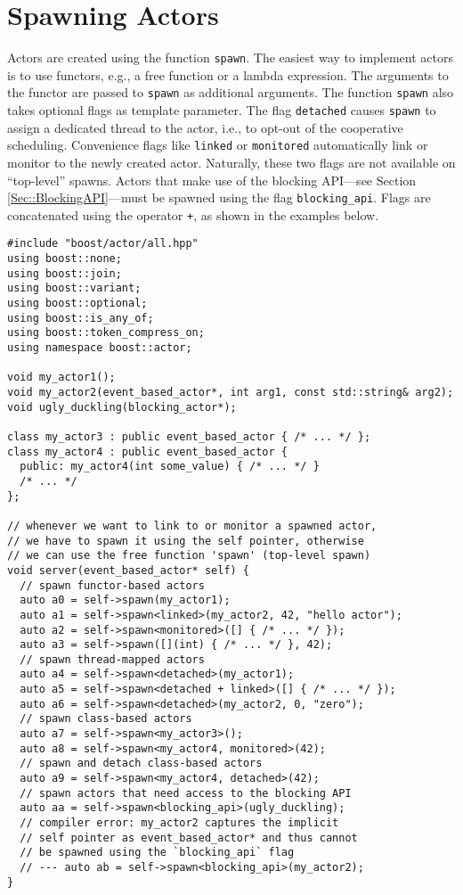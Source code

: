 \section{Spawning Actors}

Actors are created using the function \lstinline^spawn^.
The easiest way to implement actors is to use functors, e.g., a free function or a lambda expression.
The arguments to the functor are passed to \lstinline^spawn^ as additional arguments.
The function \lstinline^spawn^ also takes optional flags as template parameter.
The flag \lstinline^detached^ causes \lstinline^spawn^ to assign a dedicated thread to the actor, i.e., to opt-out of the cooperative scheduling.
Convenience flags like \lstinline^linked^ or \lstinline^monitored^ automatically link or monitor to the newly created actor.
Naturally, these two flags are not available on ``top-level'' spawns.
Actors that make use of the blocking API---see Section \ref{Sec::BlockingAPI}---must be spawned using the flag \lstinline^blocking_api^.
Flags are concatenated using the operator \lstinline^+^, as shown in the examples below.

\begin{lstlisting}
#include "boost/actor/all.hpp"
using boost::none;
using boost::join;
using boost::variant;
using boost::optional;
using boost::is_any_of;
using boost::token_compress_on;
using namespace boost::actor;

void my_actor1();
void my_actor2(event_based_actor*, int arg1, const std::string& arg2);
void ugly_duckling(blocking_actor*);

class my_actor3 : public event_based_actor { /* ... */ };
class my_actor4 : public event_based_actor {
  public: my_actor4(int some_value) { /* ... */ }
  /* ... */
};

// whenever we want to link to or monitor a spawned actor,
// we have to spawn it using the self pointer, otherwise
// we can use the free function 'spawn' (top-level spawn)
void server(event_based_actor* self) {
  // spawn functor-based actors
  auto a0 = self->spawn(my_actor1);
  auto a1 = self->spawn<linked>(my_actor2, 42, "hello actor");
  auto a2 = self->spawn<monitored>([] { /* ... */ });
  auto a3 = self->spawn([](int) { /* ... */ }, 42);
  // spawn thread-mapped actors
  auto a4 = self->spawn<detached>(my_actor1);
  auto a5 = self->spawn<detached + linked>([] { /* ... */ });
  auto a6 = self->spawn<detached>(my_actor2, 0, "zero");
  // spawn class-based actors
  auto a7 = self->spawn<my_actor3>();
  auto a8 = self->spawn<my_actor4, monitored>(42);
  // spawn and detach class-based actors
  auto a9 = self->spawn<my_actor4, detached>(42);
  // spawn actors that need access to the blocking API
  auto aa = self->spawn<blocking_api>(ugly_duckling);
  // compiler error: my_actor2 captures the implicit
  // self pointer as event_based_actor* and thus cannot
  // be spawned using the `blocking_api` flag
  // --- auto ab = self->spawn<blocking_api>(my_actor2);
}
\end{lstlisting}

